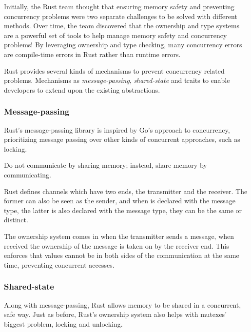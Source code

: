\begin{displayquote}
    Initially, the Rust team thought that ensuring memory safety and preventing concurrency problems were two separate challenges to be solved with different methods.
    Over time, the team discovered that the ownership and type systems are a powerful set of tools to help manage memory safety and concurrency problems!
    By leveraging ownership and type checking, many concurrency errors are compile-time errors in Rust rather than runtime errors.
\end{displayquote}

Rust provides several kinds of mechanisms to prevent concurrency related problems.
Mechanisms as \emph{message-passing}, \emph{shared-state} and
traits to enable developers to extend upon the existing abstractions.

\subsubsection*{Message-passing}

Rust's message-passing library is inspired by Go's approach to concurrency,
prioritizing message passing over other kinds of concurrent approaches, such as locking.

\begin{displayquote}
    Do not communicate by sharing memory; instead, share memory by communicating.
\end{displayquote}

Rust defines channels which have two ends, the transmitter and the receiver.
The former can also be seen as the sender, and when is declared with the message type,
the latter is also declared with the message type, they can be the same or distinct.

The ownership system comes in when the transmitter sends a message,
when received the ownership of the message is taken on by the receiver end.
This enforces that values cannot be in both sides of the communication at the same time,
preventing concurrent accesses.

\subsubsection*{Shared-state}

Along with message-passing, Rust allows memory to be shared in a concurrent, safe way.
Just as before, Rust's ownership system also helps with mutexes' biggest problem, locking and unlocking.

